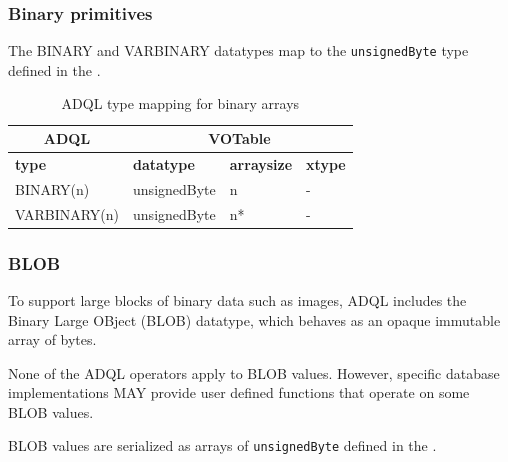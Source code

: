 \documentclass[11pt,a4paper]{ivoa}
\begin{document}
\subsubsection{Binary primitives}
\label{sec:types.binary.primitive}

The BINARY and VARBINARY datatypes map to the \verb:unsignedByte: type defined
in the \VOTableSpec.

\begin{table}[th]\footnotesize
    \begin{tabular}
        {|p{}|p{}|p{}|p{}|}
        \hline

        \hline
        \multicolumn{1}{|c|}{\textbf{ADQL}} &
        \multicolumn{3}{|c|}{\textbf{VOTable}}
        \tabularnewline
        
        \hline
        \textbf{type} &
        \textbf{datatype} &
        \textbf{arraysize} &
        \textbf{xtype}
        \tabularnewline

        \hline
        BINARY(n) &
        unsignedByte &
        n &
        -
        \tabularnewline

        \hline
        VARBINARY(n) &
        unsignedByte &
        n* &
        -
        \tabularnewline

        \hline
    \end{tabular}
    \caption{ADQL type mapping for binary arrays}
    \label{table:types.binary.primitive}
\end{table}

\subsubsection{BLOB}
\label{sec:types.binary.blob}

To support large blocks of binary data such as images,
ADQL includes the Binary Large OBject (BLOB) datatype,
which behaves as an opaque immutable array of bytes.

None of the ADQL operators apply to BLOB values.
However, specific database implementations MAY provide user
defined functions that operate on some BLOB values.

BLOB values are serialized as arrays of \verb:unsignedByte: defined
in the \VOTableSpec.
\end{document}
